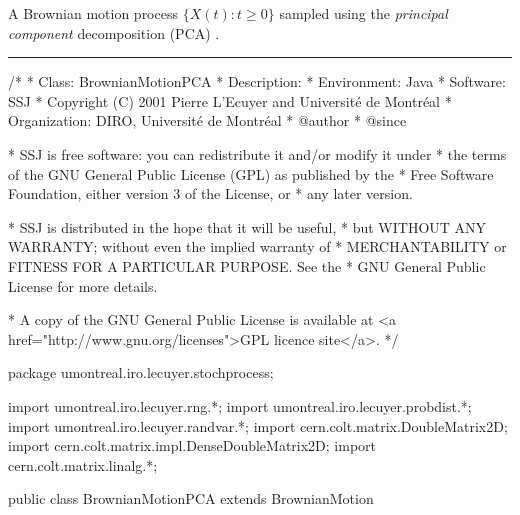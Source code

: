 
A Brownian motion process $\{X(t) : t \geq 0 \}$ sampled using the
\emph{principal component} decomposition (PCA) \cite{fGLA04a,fIMA06a,fLEC04a}.



\bigskip\hrule\bigskip

\begin{code}
\begin{hide}
/*
 * Class:        BrownianMotionPCA
 * Description:  
 * Environment:  Java
 * Software:     SSJ 
 * Copyright (C) 2001  Pierre L'Ecuyer and Université de Montréal
 * Organization: DIRO, Université de Montréal
 * @author       
 * @since

 * SSJ is free software: you can redistribute it and/or modify it under
 * the terms of the GNU General Public License (GPL) as published by the
 * Free Software Foundation, either version 3 of the License, or
 * any later version.

 * SSJ is distributed in the hope that it will be useful,
 * but WITHOUT ANY WARRANTY; without even the implied warranty of
 * MERCHANTABILITY or FITNESS FOR A PARTICULAR PURPOSE.  See the
 * GNU General Public License for more details.

 * A copy of the GNU General Public License is available at
   <a href="http://www.gnu.org/licenses">GPL licence site</a>.
 */
\end{hide}
package umontreal.iro.lecuyer.stochprocess;\begin{hide}
import umontreal.iro.lecuyer.rng.*;
import umontreal.iro.lecuyer.probdist.*;
import umontreal.iro.lecuyer.randvar.*;
import cern.colt.matrix.DoubleMatrix2D;
import cern.colt.matrix.impl.DenseDoubleMatrix2D;
import cern.colt.matrix.linalg.*;

\end{hide}

public class BrownianMotionPCA extends BrownianMotion \begin{hide} {

    protected double[][]  sigmaCov; // Matrice de covariance du vecteur des observ.
                                 // sigmaCov [i][j] = Cov[X(t_{i+1}),X(t_{j+1})].
    protected double[][]  A;     // sigmaCov = AA' (PCA decomposition).
    protected double[]    z;     // vector of standard normals.
    protected double[]    sortedEigenvalues;
    protected boolean     isDecompPCA;

\end{hide}
\end{code}
